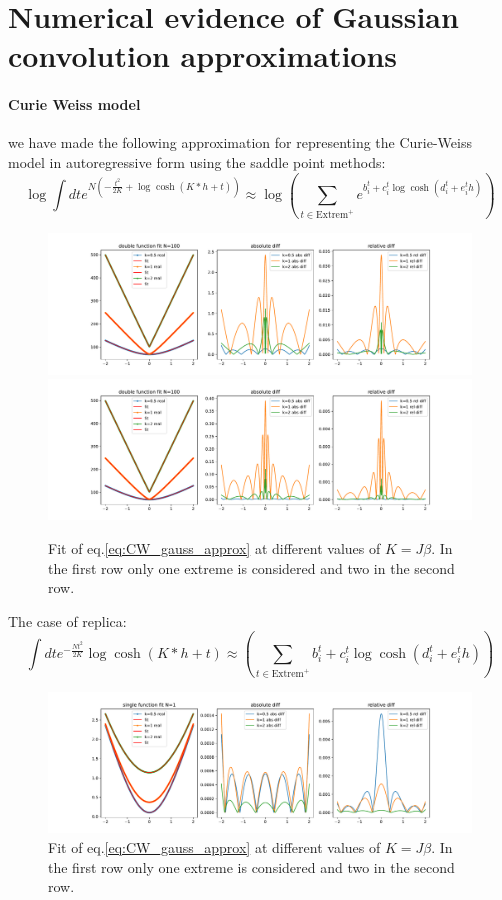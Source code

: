 \documentclass{article}
\begin{document}
\section{Numerical evidence of Gaussian convolution approximations}
\paragraph{Curie Weiss model}
we have made the following approximation for representing the Curie-Weiss model in autoregressive form using the saddle point methods:
\[
\log \int dt e^{N(-\frac{t^2}{2K}+\log\cosh(K*h+t))} \approx \log\left(\sum_{t \in \text{Extrem}^+}  e^{b_i^t + c_i^t\log\cosh(d_i^t+e_i^t h)}\right)
\label{eq:CW_gauss_approx}
\]
\begin{figure}[h]
    \centering
    \includegraphics[width=1\textwidth]{img/CW_fit_N100.pdf}
    \includegraphics[width=1\textwidth]{img/CW_fit2_N100.pdf}
    \caption{Fit of eq.\ref{eq:CW_gauss_approx} at different values of $K=J\beta$. In the first row only one extreme is considered and two in the second row.}
    \label{fig:mesh1}
\end{figure}
The case of replica:
\[
 \int dt e^{-\frac{Nt^2}{2K}}\log\cosh(K*h+t) \approx \left(\sum_{t \in \text{Extrem}^+}  b_i^t + c_i^t\log\cosh(d_i^t+e_i^t h)\right)
\label{eq:CW_gauss_approx}
\]

\begin{figure}[h]
    \centering
    \includegraphics[width=1\textwidth]{img/RFIM_fit.pdf}
    \caption{Fit of eq.\ref{eq:CW_gauss_approx} at different values of $K=J\beta$. In the first row only one extreme is considered and two in the second row.}
    \label{fig:mesh1}
\end{figure}
\end{document}
